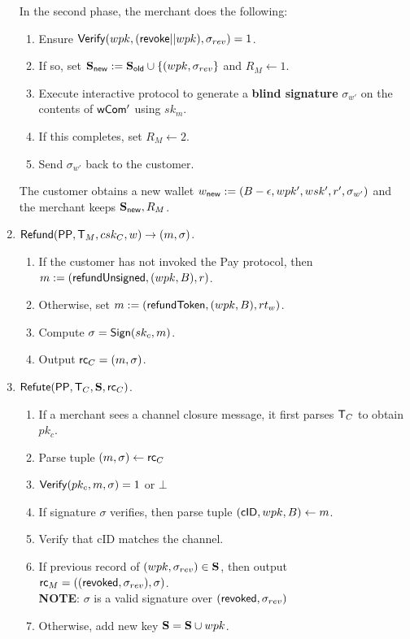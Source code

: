 \documentclass[11pt]{report}
\begin{document}
\begin{enumerate}
\medskip \noindent
In the second phase, the merchant does the following:
\begin{enumerate}
\item Ensure ${\sf Verify}(wpk, ({\sf revoke}||wpk), \sigma_{rev}) = 1$.
\item If so, set ${\bf S}_{\sf new} := {\bf S}_{\sf old} \cup \{(wpk, \sigma_{rev}\}$ and $R_{M} \leftarrow 1$.
\item Execute interactive protocol to generate a {\bf blind signature} $\sigma_{w'}$ on the contents of ${\sf wCom'}$ using $sk_m$. 
\item If this completes, set $R_{M} \leftarrow 2$.
\item Send $\sigma_{w'}$ back to the customer.
\end{enumerate}

\medskip \noindent
The customer obtains a new wallet $w_{\sf new} := (B - \epsilon, wpk', wsk', r', \sigma_{w'})$ and the merchant keeps ${\bf S}_{\sf new}, R_{M}$.


\item ${\sf Refund}({\sf PP}, {\sf T}_{M}, csk_{C}, w) \rightarrow (m, \sigma)$. 
\begin{enumerate}
\item If the customer has not invoked the {\sf Pay} protocol, then $m := ({\sf refundUnsigned}, (wpk, B), r)$.
\item Otherwise, set $m := ({\sf refundToken}, (wpk, B), rt_w)$.
\item Compute $\sigma = {\sf Sign}(sk_c, m)$.
\item Output ${\sf rc}_{C} = (m, \sigma)$.
\end{enumerate}

\item ${\sf Refute}({\sf PP}, {\sf T}_{C}, {\bf S}, {\sf rc}_{C})$.
\begin{enumerate}
\item If a merchant sees a channel closure message, it first parses ${\sf T}_{C}$ to obtain $pk_c$.
\item Parse tuple $(m, \sigma) \leftarrow {\sf rc}_{C}$ 
\item ${\sf Verify}(pk_c, m, \sigma) = 1$ or $\bot$ 
\item If signature $\sigma$ verifies, then parse tuple $({\sf cID}, wpk, B) \leftarrow m$.
\item Verify that {\sf cID} matches the channel.
\item If previous record of $(wpk, \sigma_{rev}) \in {\bf S}$, then output ${\sf rc}_{M} = (({\sf revoked}, \sigma_{rev}), \sigma)$.
\\ {\bf NOTE}: $\sigma$ is a valid signature over $({\sf revoked}, \sigma_{rev})$
\item Otherwise, add new key ${\bf S} = {\bf S} \cup wpk$.
\end{enumerate}


\end{enumerate}
\end{document}
